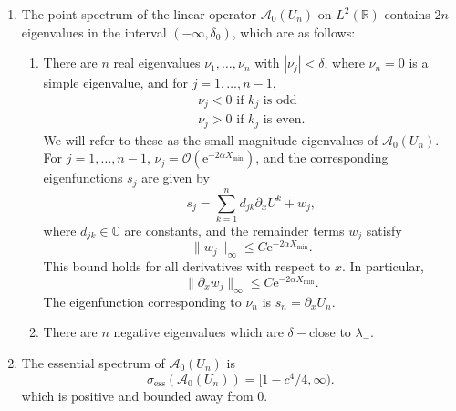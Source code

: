 \documentclass[review,onefignum,onetabnum]{siamart171218}
\newcommand{\C}{\mathbb{C}}
\newcommand{\R}{\mathbb{R}}
\newcommand{\rme}{\mathrm{e}}
\newcommand{\calA}{\mathcal{A}}
\begin{document}
\begin{theorem}
\begin{enumerate}
	\item The point spectrum of the linear operator $\calA_0(U_n)$ on $L^2(\R)$ contains $2n$ eigenvalues in the interval $(-\infty, \delta_0)$, which are as follows:
  \begin{enumerate}
    \item There are $n$ real eigenvalues $\nu_1, \dots, \nu_n$ with $|\nu_j| < \delta$, where $\nu_n = 0$ is a simple eigenvalue, and for $j = 1, \dots, n-1$,
    \[
  	\begin{array}{l}
  	\nu_j < 0 \text{ if } k_j \text{ is odd} \\
  	\nu_j > 0 \text{ if } k_j \text{ is even.}
  	\end{array}
    \]
    We will refer to these as the small magnitude eigenvalues of $\calA_0(U_n)$. For $j = 1, \dots, n-1$, $\nu_j = \mathcal{O}(\rme^{-2\alpha X_{\mathrm{min}}})$, and the corresponding eigenfunctions $s_j$ are given by
  	\begin{equation}\label{sj}
  	s_j = \sum_{k = 1}^{n} d_{jk}\partial_x U^k + w_j,
  	\end{equation}
  	where $d_{jk} \in \C$ are constants, and the remainder terms $w_j$ satisfy
  	\begin{equation}\label{sjwbound}
  	\|w_j\|_\infty \leq C\rme^{-2 \alpha X_{\mathrm{min}}}.
  	\end{equation}
    This bound holds for all derivatives with respect to $x$.
    In particular,
    \[
    \| \partial_x w_j\|_\infty \leq C\rme^{-2 \alpha X_{\mathrm{min}}}.
    \]
    The eigenfunction corresponding to $\nu_n$ is $s_n = \partial_x U_n$.

    \item There are $n$ negative eigenvalues which are $\delta-$close to $\lambda_-$.
  \end{enumerate}

  \item The essential spectrum of $\calA_0(U_n)$ is
    \begin{equation}\label{A0ess}
    \sigma_{\text{ess}}(\calA_0(U_n)) = [1 - c^4/4, \infty).
    \end{equation}
    which is positive and bounded away from 0.

\end{enumerate}
\end{theorem}
\end{document}
